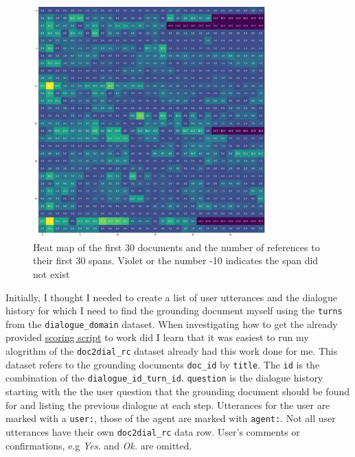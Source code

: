 \documentclass[11pt]{article}
\begin{document}
    \begin{figure}[h]
        \centering
        \includegraphics[width=0.8\textwidth]{sub_section_usage_of_spans}
        \caption{Heat map of the first 30 documents and the number of references to their first 30 spans. Violet or the number
        -10 indicates the span did not exist}
        \label{fig:heat-map-first-30-spans}
    \end{figure}

    Initially, I thought I needed to create a list of user utterances and the dialogue history for which I need to find the
    grounding document myself using the \texttt{turns} from the \texttt{dialogue\_domain} dataset. When investigating how
    to get the already provided \href{https://github.com/doc2dial/sharedtask-dialdoc2021/blob/master/scripts/sharedtask_utils.py}{scoring script}
    to work did I learn that it was easiest to run my alogrithm of the \texttt{doc2dial\_rc} dataset already had this work done for me.
    This dataset refers to the grounding documents \texttt{doc\_id} by \texttt{title}.
    The \texttt{id} is the combination of the \texttt{dialogue\_id\_turn\_id}. \texttt{question} is the dialogue history starting
    with the the user question that the grounding document should be found for and listing the previous dialogue at each step.
    Utterances for the user are marked with a \texttt{user:}, those of the agent are marked with \texttt{agent:}. Not
    all user utterances have their own \texttt{doc2dial\_rc} data row. User's comments or confirmations, e.g \textit{Yes.} and
    \textit{Ok.} are omitted.
\end{document}
